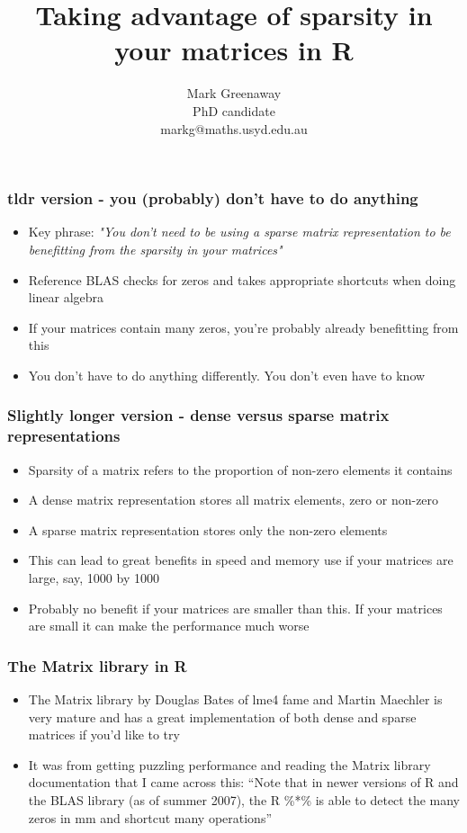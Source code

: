 \documentclass{beamer}
\title{Taking advantage of sparsity in your matrices in R}
\author{Mark Greenaway\\PhD candidate\\markg@maths.usyd.edu.au}
\begin{document}
\begin{frame}
\titlepage
\end{frame}

\begin{frame}
\frametitle{tldr version - you (probably) don't have to do anything}
\begin{itemize}
\item Key phrase: \emph{"You don't need to be using a sparse matrix representation to be 
												 benefitting from the sparsity in your matrices"}
\item Reference BLAS checks for zeros and takes appropriate shortcuts when doing linear 
			algebra
\item If your matrices contain many zeros, you're probably already benefitting from this
\item You don't have to do anything differently. You don't even have to know
\end{itemize}
\end{frame}

\begin{frame}
\frametitle{Slightly longer version - dense versus sparse matrix representations}
\begin{itemize}
\item Sparsity of a matrix refers to the proportion of non-zero elements it contains
\item A dense matrix representation stores all matrix elements, zero or non-zero
\item A sparse matrix representation stores only the non-zero elements
\item This can lead to great benefits in speed and memory use if your matrices are large, 
			say, 1000 by 1000
\item Probably no benefit if your matrices are smaller than this. If your matrices are
			small it can make the performance much worse
\end{itemize}
\end{frame}

\begin{frame}
\frametitle{The Matrix library in R}
\begin{itemize}
\item The Matrix library by Douglas Bates of lme4 fame and Martin Maechler is very mature 
			and has	a great implementation of both dense and sparse matrices if you'd like to try
\item It was from getting puzzling performance and reading the Matrix library documentation 
			that I came across this:
			``Note that in newer versions of R and the BLAS library (as of summer 2007),
				the R \%*\% is able to detect the many zeros in mm and shortcut many operations''
\end{itemize}
\end{frame}
\end{document}
